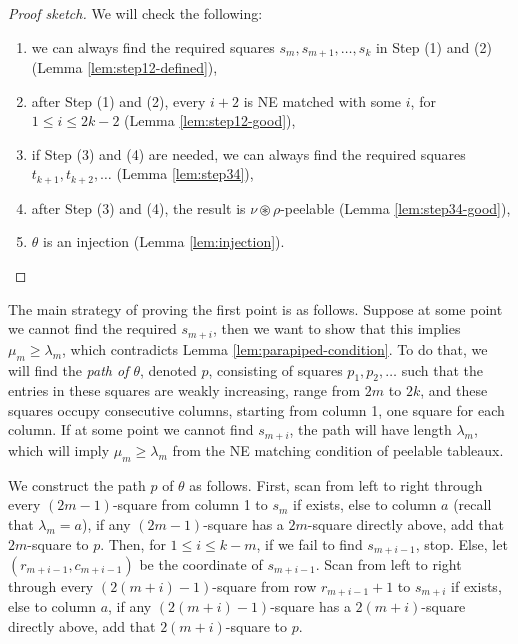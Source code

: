 \documentclass[ALCO,Unicode]{cedram}
\begin{document}
    \begin{proof}[Proof sketch]
        We will check the following:
        
        \begin{enumerate}
            \item we can always find the required squares $s_m,s_{m+1},\ldots,s_{k}$ in Step (1) and (2) (Lemma \ref{lem:step12-defined}),
            \item after Step (1) and (2), every $i+2$ is NE matched with some $i$, for $1\leq i \leq 2k-2$ (Lemma \ref{lem:step12-good}),
            \item if Step (3) and (4) are needed, we can always find the required squares $t_{k+1},t_{k+2},\ldots$ (Lemma \ref{lem:step34}),
            \item after Step (3) and (4), the result is $\nu\circledast\rho$-peelable (Lemma \ref{lem:step34-good}),
            \item $\theta$ is an injection (Lemma \ref{lem:injection}). \qedhere
        \end{enumerate}
    \end{proof}

    The main strategy of proving the first point is as follows. Suppose at some point we cannot find the required $s_{m+i}$, then we want to show that this implies $\mu_m \geq \lambda_m$, which contradicts Lemma \ref{lem:parapiped-condition}. To do that, we will find the \textit{path of $\theta$}, denoted $p$, consisting of squares $p_1,p_2,\ldots$ such that the entries in these squares are weakly increasing, range from $2m$ to $2k$, and these squares occupy consecutive columns, starting from column 1, one square for each column. If at some point we cannot find $s_{m+i}$, the path will have length $\lambda_m$, which will imply $\mu_m\geq \lambda_m$ from the NE matching condition of peelable tableaux.

    \begin{defi}\label{def:path}
        We construct the path $p$ of $\theta$ as follows. First, scan from left to right through every $(2m-1)$-square from column 1 to $s_m$ if exists, else to column $a$ (recall that $\lambda_m = a$), if any $(2m-1)$-square has a $2m$-square directly above, add that $2m$-square to $p$. Then, for $1\leq i\leq k-m$, if we fail to find $s_{m+i-1}$, stop. Else, let $(r_{m+i-1}, c_{m+i-1})$ be the coordinate of $s_{m+i-1}$. Scan from left to right through every $(2(m+i)-1)$-square from row $r_{m+i-1}+1$ to $s_{m+i}$ if exists, else to column $a$, if any $(2(m+i)-1)$-square has a $2(m+i)$-square directly above, add that $2(m+i)$-square to $p$.
    \end{defi}
\end{document}
